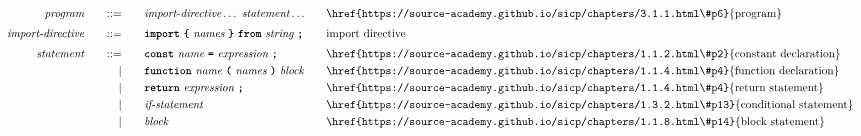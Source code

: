 \begin{alignat*}{9}
&& \textit{program}    &&\quad ::= &\quad && \textit{import-directive} \ldots \ \textit{statement} \ldots
                                                           && \textrm{\href{https://source-academy.github.io/sicp/chapters/3.1.1.html\#p6}{program}} \\[1mm]
&& \textit{import-directive}    &&\quad ::= &\quad && \textbf{\texttt{import}}\ \textbf{\texttt{\{}}\ \textit{names} \ \textbf{\texttt{\}}}\ \textbf{\texttt{from}}\  \textit{string} \ \textbf{\texttt{;}}
                                                           && \textrm{import directive} \\[1mm]
&& \textit{statement}    &&\quad ::= &\quad && \textbf{\texttt{const}}\  \textit{name} \ 
                                           \textbf{\texttt{=}}\  \textit{expression} \ \textbf{\texttt{;}}
                                                           && \textrm{\href{https://source-academy.github.io/sicp/chapters/1.1.2.html\#p2}{constant declaration}} \\
&&                       && |   &\quad && \textbf{\texttt{function}}\  \textit{name} \ 
                                   \textbf{\texttt{(}}\  \textit{names} \ \textbf{\texttt{)}}\ \textit{block} \quad
                                                           && \textrm{\href{https://source-academy.github.io/sicp/chapters/1.1.4.html\#p4}{function declaration}}\\
&&                       && |   &\quad && \textbf{\texttt{return}}\  \textit{expression} \ \textbf{\texttt{;}}
                                                           && \textrm{\href{https://source-academy.github.io/sicp/chapters/1.1.4.html\#p4}{return statement}}\\
&&                       && |   &\quad && \textit{if-statement} \quad
                                                           && \textrm{\href{https://source-academy.github.io/sicp/chapters/1.3.2.html\#p13}{conditional statement}}\\
&&                       && |   &\quad &&  \textit{block} 
                                                           && \textrm{\href{https://source-academy.github.io/sicp/chapters/1.1.8.html\#p14}{block statement}}\\

\end{alignat*}
